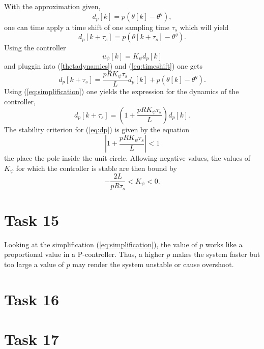 \documentclass[a4paper,12pt,oneside,onecolumn]{article} %
\begin{document}
With the approximation given,
\begin{equation}
\label{eq:simplification}
d_p[k] = p(\theta[k] - \theta^g),
\end{equation}
one can time apply a time shift of one sampling time $\tau_s$ which will yield
\begin{equation}
\label{eq:timeshift}
d_p[k + \tau_s] = p(\theta[k + \tau_s] - \theta^g).
\end{equation}
Using the controller 
\begin{equation}
u_\psi[k] = K_\psi d_p[k]
\end{equation}
and pluggin into (\ref{thetadynamics}) and (\ref{eq:timeshift}) one gets
\begin{equation}
d_p[k + \tau_s] = \frac{p R K_\psi \tau_s}{L} d_p[k] + p(\theta[k] - \theta^g).
\end{equation}
Using (\ref{eq:simplification}) one yields the expression for the dynamics of the controller,
\begin{equation}
\label{eq:dp}
d_p[k+\tau_s] = \left ( 1 + \frac{p R K_\psi \tau_s}{L} \right ) d_p[k].
\end{equation}
The stability criterion for (\ref{eq:dp}) is given by the equation
\begin{equation}
\left | 1 + \frac{p R K_\psi \tau_s}{L} \right | < 1
\end{equation}
the place the pole inside the unit circle.
Allowing negative values, the values of $K_\psi$ for which the controller is stable are then bound by
\begin{equation}
-\frac{2L}{p R \tau_s} < K_\psi < 0.
\end{equation}
\section*{Task 15}
Looking at the simplification (\ref{eq:simplification}), the value of $p$ works like a proportional value in a P-controller. Thus, a higher $p$ makes the system faster but too large a value of $p$ may render the system unstable or cause overshoot.

\section*{Task 16}

  
  
\section*{Task 17}
\end{document}
